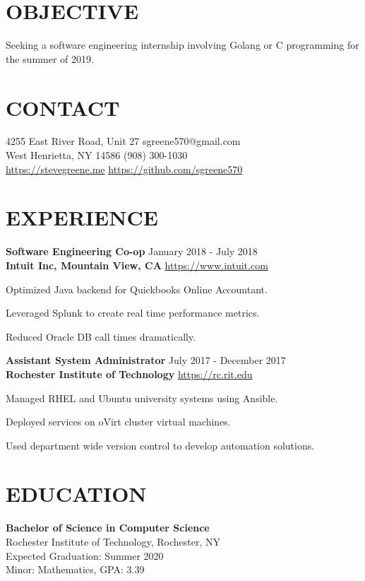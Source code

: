 \documentclass[line, margin, 11pt]{res}
\begin{document}

\begin{resume}

\section{OBJECTIVE}
Seeking a software engineering internship involving Golang or C programming for the summer of 2019.

\section {CONTACT}
4255 East River Road, Unit 27 \hfill sgreene570@gmail.com \\
West Henrietta, NY 14586 \hfill (908) 300-1030 \\
\url{https://stevegreene.me} \hfill \url{https://github.com/sgreene570}

\section{EXPERIENCE}
{\bf \large{Software Engineering Co-op}} \hfill January 2018 - July 2018 \\
{\bf Intuit Inc, Mountain View, CA} \hfill \url{https://www.intuit.com}
\begin{compactitem}
    \item Optimized Java backend for Quickbooks Online Accountant.
    \item Leveraged Splunk to create real time performance metrics.
    \item Reduced Oracle DB call times dramatically.
\end{compactitem}

{\bf \large{Assistant System Administrator}} \hfill July 2017 - December 2017 \\
{\bf Rochester Institute of Technology} \hfill \url{https://rc.rit.edu}
\begin{compactitem}
    \item Managed RHEL and Ubuntu university systems using Ansible.
    \item Deployed services on oVirt cluster virtual machines.
    \item Used department wide version control to develop automation solutions.
\end{compactitem}

\section{EDUCATION}
{\bf Bachelor of Science in Computer Science} \\
Rochester Institute of Technology, Rochester, NY \\
Expected Graduation: Summer 2020 \\
Minor: Mathematics, GPA: 3.39



\end{resume}
\end{document}
